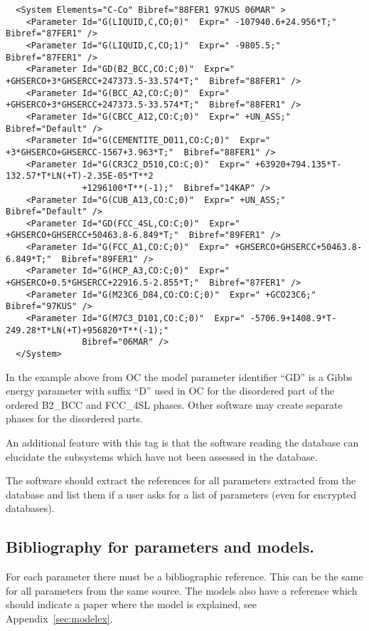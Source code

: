 \documentclass{article}
\begin{document}
{\begin{verbatim}
  <System Elements="C-Co" Bibref="88FER1 97KUS 06MAR" >
    <Parameter Id="G(LIQUID,C,CO;0)"  Expr=" -107940.6+24.956*T;"  Bibref="87FER1" />
    <Parameter Id="G(LIQUID,C,CO;1)"  Expr=" -9805.5;"  Bibref="87FER1" />
    <Parameter Id="GD(B2_BCC,CO:C;0)"  Expr=" +GHSERCO+3*GHSERCC+247373.5-33.574*T;"  Bibref="88FER1" />
    <Parameter Id="G(BCC_A2,CO:C;0)"  Expr=" +GHSERCO+3*GHSERCC+247373.5-33.574*T;"  Bibref="88FER1" />
    <Parameter Id="G(CBCC_A12,CO:C;0)"  Expr=" +UN_ASS;"  Bibref="Default" />
    <Parameter Id="G(CEMENTITE_D011,CO:C;0)"  Expr=" +3*GHSERCO+GHSERCC-1567+3.963*T;"  Bibref="88FER1" />
    <Parameter Id="G(CR3C2_D510,CO:C;0)"  Expr=" +63920+794.135*T-132.57*T*LN(+T)-2.35E-05*T**2
               +1296100*T**(-1);"  Bibref="14KAP" />
    <Parameter Id="G(CUB_A13,CO:C;0)"  Expr=" +UN_ASS;"  Bibref="Default" />
    <Parameter Id="GD(FCC_4SL,CO:C;0)"  Expr=" +GHSERCO+GHSERCC+50463.8-6.849*T;"  Bibref="89FER1" />
    <Parameter Id="G(FCC_A1,CO:C;0)"  Expr=" +GHSERCO+GHSERCC+50463.8-6.849*T;"  Bibref="89FER1" />
    <Parameter Id="G(HCP_A3,CO:C;0)"  Expr=" +GHSERCO+0.5*GHSERCC+22916.5-2.855*T;"  Bibref="87FER1" />
    <Parameter Id="G(M23C6_D84,CO:CO:C;0)"  Expr=" +GCO23C6;"  Bibref="97KUS" />
    <Parameter Id="G(M7C3_D101,CO:C;0)"  Expr=" -5706.9+1408.9*T-249.28*T*LN(+T)+956820*T**(-1);"
               Bibref="06MAR" />
  </System>
\end{verbatim}
}


In the example above from OC the model parameter identifier ``GD'' is
a Gibbs energy parameter with suffix ``D'' used in OC for the
disordered part of the ordered B2\_BCC and FCC\_4SL phases.  Other
software may create separate phases for the disordered parts.

An additional feature with this tag is that the software reading the
database can elucidate the subsystems which have not been assessed in
the database.

The software should extract the references for all parameters
extracted from the database and list them if a user asks for a list of
parameters (even for encrypted databases).

\newpage 

\subsection{Bibliography for parameters and models.}\label{sec:biblio}

For each parameter there must be a bibliographic reference.  This can
be the same for all parameters from the same source.  The models also
have a reference which should indicate a paper where the model is
explained, see Appendix~\ref{sec:modelex}.
\end{document}
